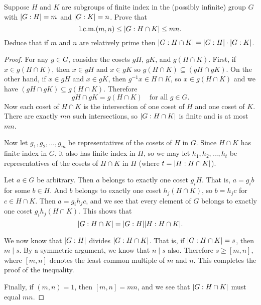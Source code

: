 \label{exercise:quotient-group:index-subgroup-intersection}
Suppose $H$ and $K$ are subgroups of finite index in the (possibly
infinite) group $G$ with $\lvert{G:H}\rvert = m$ and $\lvert{G:K}\rvert = n$. Prove
that
\begin{equation*}
  \text{l.c.m.}(m,n)\leq\lvert{G:H\cap K}\rvert\leq mn.
\end{equation*}
Deduce that if $m$ and $n$ are relatively prime then
$\lvert{G:H\cap K}\rvert = \lvert{G:H}\rvert\cdot\lvert{G:K}\rvert$.
\begin{proof}
  For any $g\in G$, consider the cosets $gH$, $gK$, and $g(H\cap
  K)$. First, if $x\in g(H\cap K)$, then $x\in gH$ and $x\in gK$ so
  $g(H\cap K)\subseteq(gH\cap gK)$. On the other hand, if $x\in gH$
  and $x\in gK$, then $g^{-1}x\in H\cap K$, so $x\in g(H\cap K)$ and
  we have $(gH\cap gK)\subseteq g(H\cap K)$. Therefore
  \begin{equation*}
    gH\cap gK = g(H\cap K)
    \quad\text{for all $g\in G$}.
  \end{equation*}
  Now each coset of $H\cap K$ is the intersection of one coset of $H$
  and one coset of $K$. There are exactly $mn$ such intersections, so
  $\lvert{G:H\cap K}\rvert$ is finite and is at most $mn$.

  Now let $g_1,g_2,\dots,g_m$ be representatives of the cosets of $H$
  in $G$. Since $H\cap K$ has finite index in $G$, it also has finite
  index in $H$, so we may let $h_1,h_2,\dots,h_t$ be representatives
  of the cosets of $H\cap K$ in $H$ (where $t = \lvert{H:H\cap
    K}\rvert$).

  Let $a\in G$ be arbitrary. Then $a$ belongs to exactly one coset
  $g_iH$. That is, $a = g_ib$ for some $b\in H$. And $b$ belongs to
  exactly one coset $h_j(H\cap K)$, so $b = h_jc$ for $c\in H\cap
  K$. Then $a = g_ih_jc$, and we see that every element of $G$ belongs
  to exactly one coset $g_ih_j(H\cap K)$. This shows that
  \begin{equation*}
    \lvert{G:H\cap K}\rvert = \lvert{G:H}\rvert\lvert{H:H\cap K}\rvert.
  \end{equation*}

  We now know that $\lvert{G:H}\rvert$ divides $\lvert{G:H\cap
    K}\rvert$. That is, if $\lvert{G:H\cap K}\rvert = s$, then $m\mid s$. By a
  symmetric argument, we know that $n\mid s$ also. Therefore
  $s\geq[m,n]$, where $[m,n]$ denotes the least common multiple of $m$
  and $n$. This completes the proof of the inequality.

  Finally, if $(m,n) = 1$, then $[m,n] = mn$, and we see that
  $\lvert{G:H\cap K}\rvert$ must equal $mn$.
\end{proof}

